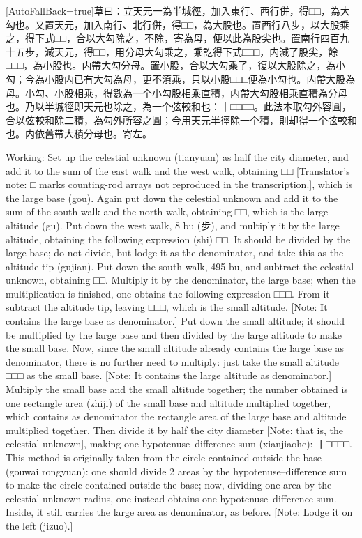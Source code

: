 \documentclass[11pt]{article}
\newcommand{\zhsmall}{\footnotesize\color{black!70}}
\newcommand{\unitlabel}[1]{\marginpar{\raggedleft\tiny\color{gray}#1}}
\newenvironment{unitzh}{\par\CJKfontspec{Noto Serif CJK SC}[AutoFallBack=true]\large\linespread{1.25}\selectfont}{\par}
\newenvironment{uniten}{\par\small\color{black!85}}{\par\medskip}
\begin{document}
\begin{unitzh}\unitlabel{ceyuan-031.1}草曰：立天元一為半城徑，加入東行、西行併，得□□，為大勾也。又置天元，加入南行、北行併，得□□，為大股也。置西行八步，以大股乘之，得下式□□，合以大勾除之，不除，寄為母，便以此為股尖也。置南行四百九十五步，減天元，得□□，用分母大勾乘之，乘訖得下式□□□，内減了股尖，餘□□□，為小股也。{\zhsmall 内帶大勾分母。}置小股，合以大勾乘了，復以大股除之，為小勾；今為小股内已有大勾為母，更不湏乘，只以小股□□□便為小勾也。{\zhsmall 内帶大股為母。}小勾、小股相乘，得數為一个小勾股相乘直積，内帶大勾股相乘直積為分母也。乃以半城徑{\zhsmall 即天元也}除之，為一个弦較和也：丨□□□□。此法本取勾外容圓，合以弦較和除二積，為勾外所容之圓；今用天元半徑除一个積，則却得一个弦較和也。内依舊帶大積分母也。{\zhsmall 寄左。}\end{unitzh}
\begin{uniten}Working: Set up the celestial unknown (tianyuan) as half the city diameter, and add it to the sum of the east walk and the west walk, obtaining □□ [Translator's note: □ marks counting-rod arrays not reproduced in the transcription.], which is the large base (gou). Again put down the celestial unknown and add it to the sum of the south walk and the north walk, obtaining □□, which is the large altitude (gu). Put down the west walk, 8 bu (步), and multiply it by the large altitude, obtaining the following expression (shi) □□. It should be divided by the large base; do not divide, but lodge it as the denominator, and take this as the altitude tip (gujian). Put down the south walk, 495 bu, and subtract the celestial unknown, obtaining □□. Multiply it by the denominator, the large base; when the multiplication is finished, one obtains the following expression □□□. From it subtract the altitude tip, leaving □□□, which is the small altitude. [Note: It contains the large base as denominator.] Put down the small altitude; it should be multiplied by the large base and then divided by the large altitude to make the small base. Now, since the small altitude already contains the large base as denominator, there is no further need to multiply: just take the small altitude □□□ as the small base. [Note: It contains the large altitude as denominator.] Multiply the small base and the small altitude together; the number obtained is one rectangle area (zhiji) of the small base and altitude multiplied together, which contains as denominator the rectangle area of the large base and altitude multiplied together. Then divide it by half the city diameter [Note: that is, the celestial unknown], making one hypotenuse–difference sum (xianjiaohe): 丨□□□□. This method is originally taken from the circle contained outside the base (gouwai rongyuan): one should divide 2 areas by the hypotenuse–difference sum to make the circle contained outside the base; now, dividing one area by the celestial-unknown radius, one instead obtains one hypotenuse–difference sum. Inside, it still carries the large area as denominator, as before. [Note: Lodge it on the left (jizuo).]\end{uniten}
\end{document}

